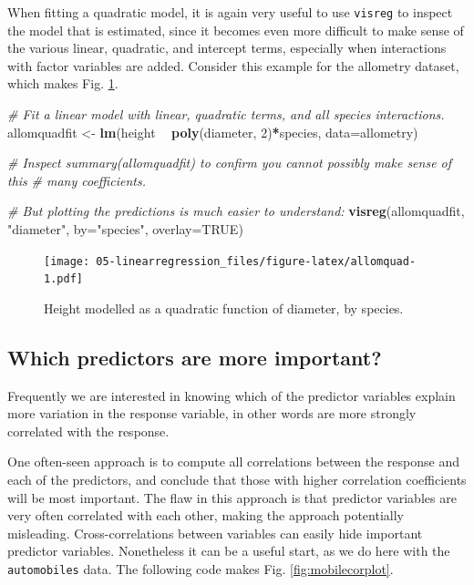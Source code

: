 \documentclass[]{book}
\newenvironment{Shaded}{\begin{snugshade}}{\end{snugshade}}
\newcommand{\CommentTok}[1]{\textcolor[rgb]{0.56,0.35,0.01}{\textit{#1}}}
\newcommand{\DataTypeTok}[1]{\textcolor[rgb]{0.13,0.29,0.53}{#1}}
\newcommand{\DecValTok}[1]{\textcolor[rgb]{0.00,0.00,0.81}{#1}}
\newcommand{\KeywordTok}[1]{\textcolor[rgb]{0.13,0.29,0.53}{\textbf{#1}}}
\newcommand{\NormalTok}[1]{#1}
\newcommand{\OperatorTok}[1]{\textcolor[rgb]{0.81,0.36,0.00}{\textbf{#1}}}
\newcommand{\OtherTok}[1]{\textcolor[rgb]{0.56,0.35,0.01}{#1}}
\newcommand{\StringTok}[1]{\textcolor[rgb]{0.31,0.60,0.02}{#1}}
\begin{document}
When fitting a quadratic model, it is again very useful to use \texttt{visreg} to inspect the model that is estimated, since it becomes even more difficult to make sense of the various linear, quadratic, and intercept terms, especially when interactions with factor variables are added. Consider this example for the allometry dataset, which makes Fig. \ref{fig:allomquad}.

\begin{Shaded}
\begin{Highlighting}[]
\CommentTok{# Fit a linear model with linear, quadratic terms, and all species interactions.}
\NormalTok{allomquadfit <-}\StringTok{ }\KeywordTok{lm}\NormalTok{(height }\OperatorTok{~}\StringTok{ }\KeywordTok{poly}\NormalTok{(diameter, }\DecValTok{2}\NormalTok{)}\OperatorTok{*}\NormalTok{species, }\DataTypeTok{data=}\NormalTok{allometry)}

\CommentTok{# Inspect summary(allomquadfit) to confirm you cannot possibly make sense of this}
\CommentTok{# many coefficients.}

\CommentTok{# But plotting the predictions is much easier to understand:}
\KeywordTok{visreg}\NormalTok{(allomquadfit, }\StringTok{"diameter"}\NormalTok{, }\DataTypeTok{by=}\StringTok{"species"}\NormalTok{, }\DataTypeTok{overlay=}\OtherTok{TRUE}\NormalTok{)}
\end{Highlighting}
\end{Shaded}

\begin{figure}
\centering
\texttt{[image: 05-linearregression\_files/figure-latex/allomquad-1.pdf]}
\caption{\label{fig:allomquad}Height modelled as a quadratic function of diameter, by species.}
\end{figure}

\hypertarget{which-predictors-are-more-important}{%
\subsection{Which predictors are more important?}\label{which-predictors-are-more-important}}

Frequently we are interested in knowing which of the predictor variables explain more variation in the response variable, in other words are more strongly correlated with the response.

One often-seen approach is to compute all correlations between the response and each of the predictors, and conclude that those with higher correlation coefficients will be most important. The flaw in this approach is that predictor variables are very often correlated with each other, making the approach potentially misleading. Cross-correlations between variables can easily hide important predictor variables. Nonetheless it can be a useful start, as we do here with the \texttt{automobiles} data. The following code makes Fig. \ref{fig:mobilecorplot}.
\end{document}

